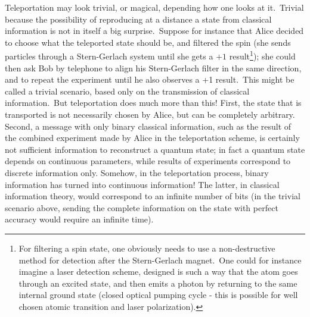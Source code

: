 \documentclass[12pt,onecolumn]{article}%
\begin{document}
Teleportation may look trivial, or magical, depending how one looks at
it.\ Trivial because the possibility of reproducing at a distance a state from
classical information is not in itself a big surprise.\ Suppose for instance
that Alice decided to choose what the teleported state should be, and filtered
the spin (she sends particles through a Stern-Gerlach system until she gets a
$+1$ result\footnote{For filtering a spin state, one obviously needs to use a
non-destructive method for detection after the Stern-Gerlach magnet.\ One
could for instance imagine a laser detection scheme, designed is such a way
that the atom goes through an excited state, and then emits a photon by
returning to the same internal ground state (closed optical pumping cycle -
this is possible for well chosen atomic transition and laser polarization).});
she could then ask Bob by telephone to align his Stern-Gerlach filter in the
same direction, and to repeat the experiment until he also observes a +1
result.\ This might be called a trivial scenario, based only on the
transmission of classical information.\ But teleportation does much more than
this! First, the state that is transported is not necessarily chosen by Alice,
but can be completely arbitrary. Second, a message with only binary classical
information, such as the result of the combined experiment made by Alice in
the teleportation scheme, is certainly not sufficient information to
reconstruct a quantum state; in fact a quantum state depends on continuous
parameters, while results of experiments correspond to discrete information
only. Somehow, in the teleportation process, binary information has turned
into continuous information! The latter, in classical information theory,
would correspond to an infinite number of bits (in the trivial scenario above,
sending the complete information on the state with perfect accuracy would
require an infinite time).
\end{document}
